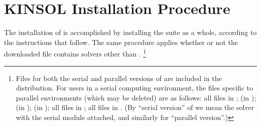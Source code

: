\chapter{KINSOL Installation Procedure}\label{c:install}

The installation of {\kinsol} is accomplished by installing the
{\sundials} suite as a whole, according to the instructions that
follow. The same procedure applies whether or not the downloaded
file contains solvers other than {\kinsol}. \footnote{Files for both
the serial and parallel versions of {\kinsol} are included in the
distribution. For users in a serial computing environment, the files
specific to parallel environments (which may be deleted) are as follows:
all files in ;
 (in );
 (in );
 (in );
all files in ;
all files in .
(By ``serial version'' of {\kinsol} we mean the {\kinsol} solver with the
serial {\nvector} module attached, and similarly for ``parallel version''.)}

